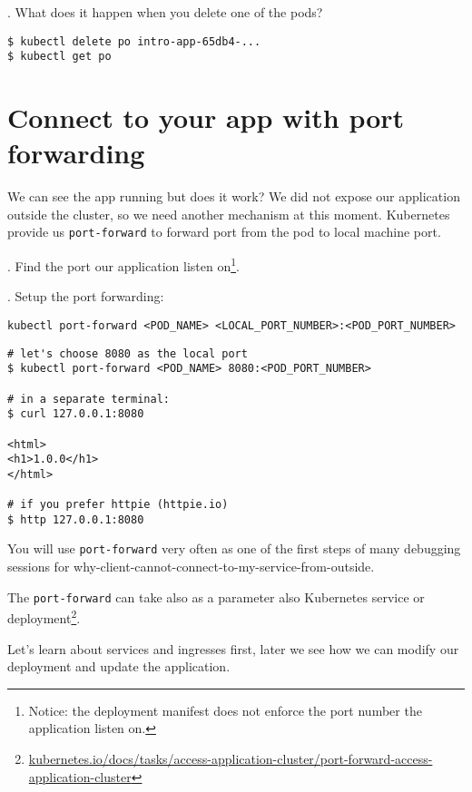 \documentclass[12pt, letterpaper]{article}
\begin{document}
. What does it happen when you delete one of the pods?
\begin{verbatim}
$ kubectl delete po intro-app-65db4-...
$ kubectl get po
\end{verbatim}

\section{Connect to your app with port forwarding}

We can see the app running but does it work? We did not expose our application outside the cluster, so we need another mechanism at this moment. Kubernetes provide us \verb|port-forward| to forward port from the pod to local machine port.

. Find the port our application listen on\footnote{Notice: the deployment manifest does not enforce the port number the application listen on.}.

. Setup the port forwarding:

\begin{verbatim}
kubectl port-forward <POD_NAME> <LOCAL_PORT_NUMBER>:<POD_PORT_NUMBER>
\end{verbatim}

\begin{verbatim}
# let's choose 8080 as the local port
$ kubectl port-forward <POD_NAME> 8080:<POD_PORT_NUMBER>

# in a separate terminal:
$ curl 127.0.0.1:8080

<html>
<h1>1.0.0</h1>
</html>

# if you prefer httpie (httpie.io)
$ http 127.0.0.1:8080
\end{verbatim}

\smallskip

You will use \verb|port-forward| very often as one of the first steps of many debugging sessions for why-client-cannot-connect-to-my-service-from-outside.

\bigskip

The \verb|port-forward| can take also as a parameter also Kubernetes service or deployment\footnote{\href{https://kubernetes.io/docs/tasks/access-application-cluster/port-forward-access-application-cluster/}{kubernetes.io/docs/tasks/access-application-cluster/port-forward-access-application-cluster}}.

\bigskip
Let's learn about services and ingresses first, later
we see how we can modify our deployment and update the application.
\end{document}
